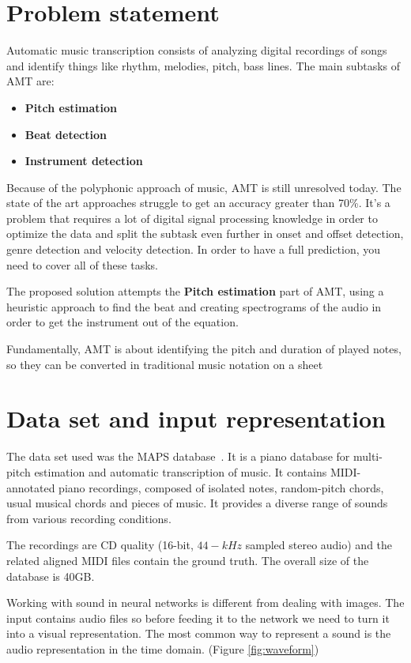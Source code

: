 \section{Problem statement}
Automatic music transcription consists of analyzing digital recordings of songs and identify things like rhythm, melodies, pitch, bass lines. The main subtasks of AMT are:

\begin{itemize}
	\item \textbf{Pitch estimation}
	\item \textbf{Beat detection}
	\item \textbf{Instrument detection}
\end{itemize}

Because of the polyphonic approach of music, AMT is still unresolved today. The state of the art approaches struggle to get an accuracy greater than 70\%. It's a problem that requires a lot of digital signal processing knowledge in order to optimize the data and split the subtask even further in onset and offset detection, genre detection and velocity detection. In order to have a full prediction, you need to cover all of these tasks.
	
The proposed solution attempts the \textbf{Pitch estimation} part of AMT, using a heuristic approach to find the beat and creating spectrograms of the audio in order to get the instrument out of the equation.
	

Fundamentally, AMT is about identifying the pitch and duration of played notes, so they can be converted in traditional music notation on a sheet

\section{Data set and input representation}
The data set used was the MAPS database~\cite{maps}. It is a piano database for multi-pitch estimation and automatic transcription of music. It contains MIDI-annotated piano recordings, composed of isolated notes, random-pitch chords, usual musical chords and pieces of music. It provides a diverse range of sounds from various recording conditions.
\par
The recordings are CD quality (16-bit, $44-kHz$ sampled stereo audio) and the related aligned MIDI files contain the ground truth. The overall size of the database is 40GB. 
\par
Working with sound in neural networks is different from dealing with images. The input contains audio files so before feeding it to the network we need to turn it into a visual representation. The most common way to represent a sound is the audio representation in the time domain. (Figure \ref{fig:waveform})

